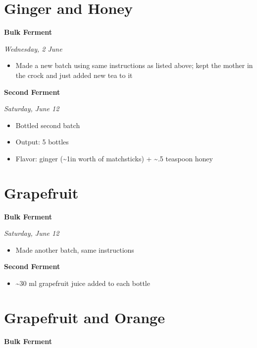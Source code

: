 \documentclass[
]{book}
\providecommand{\tightlist}{%
  \setlength{\itemsep}{0pt}\setlength{\parskip}{0pt}}
\begin{document}
\hypertarget{ginger-and-honey}{%
\section{Ginger and Honey}\label{ginger-and-honey}}

\textbf{Bulk Ferment}

\emph{Wednesday, 2 June}

\begin{itemize}
\tightlist
\item
  Made a new batch using same instructions as listed above; kept the mother in the crock and just added new tea to it
\end{itemize}

\textbf{Second Ferment}

\emph{Saturday, June 12}

\begin{itemize}
\tightlist
\item
  Bottled second batch
\item
  Output: 5 bottles
\item
  Flavor: ginger (\textasciitilde1in worth of matchsticks) + \textasciitilde.5 teaspoon honey
\end{itemize}

\hypertarget{grapefruit-1}{%
\section{Grapefruit}\label{grapefruit-1}}

\textbf{Bulk Ferment}

\emph{Saturday, June 12}

\begin{itemize}
\tightlist
\item
  Made another batch, same instructions
\end{itemize}

\textbf{Second Ferment}

\begin{itemize}
\tightlist
\item
  \textasciitilde30 ml grapefruit juice added to each bottle
\end{itemize}

\hypertarget{grapefruit-and-orange}{%
\section{Grapefruit and Orange}\label{grapefruit-and-orange}}

\textbf{Bulk Ferment}
\end{document}
